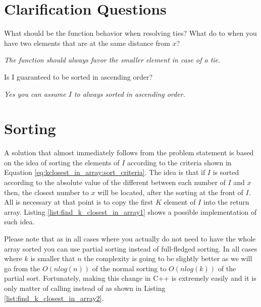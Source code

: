 \section{Clarification Questions}

\begin{QandA}
	\item What should be the function behavior when resolving ties? What do to when you have two
	elements that are at the same distance from $x$?
	\begin{answered}
		\textit{The function should always favor the smaller element in case of a tie.}
	\end{answered}
	
	\item Is I guaranteed to be sorted in ascending order?
	\begin{answered}
		\textit{Yes you can assume $I$ to  always sorted in ascending order.}
	\end{answered}
	
\end{QandA}

\section{Sorting}
\label{sec:find_k_closest_in_array:sorting}
A solution that almost immediately follows from the problem statement is based on the idea of
sorting the elements of $I$ according to the criteria shown in Equation
\ref{eq:kclosest_in_array:sort_criteria}. The idea is that if $I$ is sorted according to the
absolute value of the different between each number of $I$ and $x$ then, the closest number to $x$
will be located, after the sorting at the front of $I$. All is necessary at that point is to copy
the first $K$ element of $I$ into the return array. Listing \ref{list:find_k_closest_in_array1}
shows a possible implementation of such idea. 


Please note that as in all cases where you actually do not need to have the whole array sorted you
can use partial sorting instead of full-fledged sorting. In all cases where $k$ is smaller that
$n$ the complexity is going to be slightly better as we will go from the $O(nlog(n))$ of the normal
sorting to $O(nlog(k))$ of the partial sort. Fortunately, making this change in C++ is extremely
easily and it is only matter of calling  instead of  as
shown in Listing \ref{list:find_k_closest_in_array2}.

